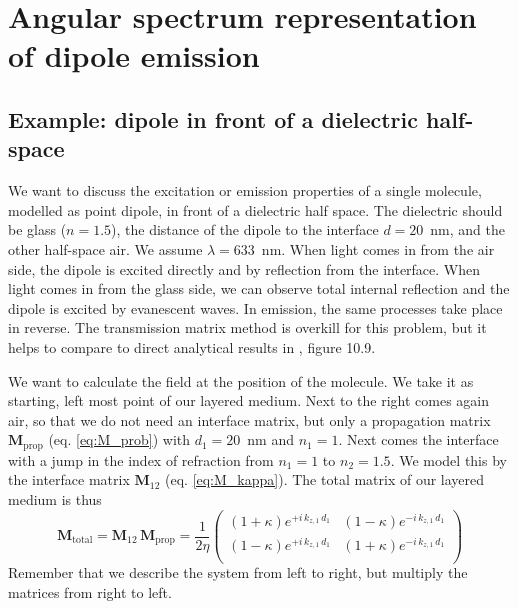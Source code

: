 \renewcommand{\lastmod}{September 24, 2021}
\renewcommand{\chapterauthors}{Markus Lippitz}

 
\chapter{Angular spectrum representation of dipole emission}



\section{Example: dipole in front of a dielectric half-space}

We want to discuss the excitation or emission properties of a single molecule, modelled as point dipole, in front of a dielectric half space. The dielectric should be glass ($n = 1.5$), the distance of the dipole to the interface $d=20$~nm, and the other half-space air. We assume $\lambda = 633$~nm. When light comes in from the air side, the dipole is excited directly and by reflection from the interface. When light comes in from the glass side, we can observe total internal reflection and the dipole is excited by evanescent waves. In emission, the same processes take place in reverse. The transmission matrix method is overkill for this problem, but it helps to compare to direct analytical results in \cite{Novotny-Hecht2012}, figure 10.9.

We want to calculate the field at the position of the molecule. We take it as starting, left most point of our layered medium. Next to the right comes again air, so that we do not need an interface matrix, but only a propagation matrix $\mathbf{M}_\text{prop}$ (eq. 
\ref{eq:M_prob})  with $d_1 =20$~nm and $n_1 = 1$. Next comes the interface with a jump in the index of refraction from  $n_1 = 1$ to  $n_2 = 1.5$. We model this by the interface matrix $\mathbf{M}_{12}$ (eq.  \ref{eq:M_kappa}). The total matrix of our layered medium is thus
\begin{equation}
\mathbf{M}_\text{total} = \mathbf{M}_{12} \,  \mathbf{M}_\text{prop} = 
\frac{ 1}{2 \eta }
\begin{pmatrix}
(1 + \kappa)  e^{+i \, k_{z,1} \, d_1 }  & (1  -\kappa) e^{-i \, k_{z,1} \, d_1 }  \\ 
( 1  - \kappa ) e^{+i \, k_{z,1} \, d_1 }  & (1 + \kappa) e^{-i \, k_{z,1} \, d_1 }  \\
\end{pmatrix}
\end{equation}
Remember that we describe the system from left to right, but multiply the matrices from right to left.

